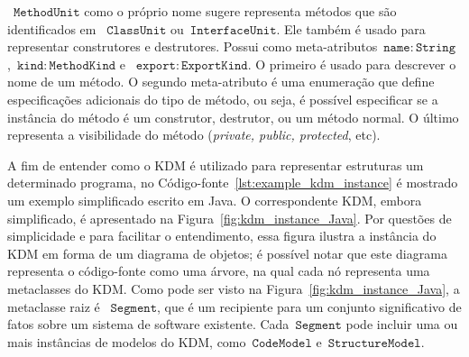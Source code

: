 ~$\mathtt{MethodUnit}$ como o próprio nome sugere representa métodos que são identificados em ~$\mathtt{ClassUnit}$ ou~$\mathtt{InterfaceUnit}$. Ele também é usado para representar construtores e destrutores. Possui como meta-atributos~$\mathtt{name:String}$,~$\mathtt{kind:MethodKind}$ e ~$\mathtt{export:ExportKind}$. O primeiro é usado para descrever o nome de um método. O segundo meta-atributo é uma enumeração que define especificações adicionais do tipo de método, ou seja, é possível especificar se a instância do método é um construtor, destrutor, ou um método normal. O último representa a visibilidade do método (\textit{private, public, protected}, etc).


A fim de entender como o KDM é utilizado para representar estruturas um determinado programa, no Código-fonte~\ref{lst:example_kdm_instance} é mostrado um exemplo simplificado escrito em Java. O correspondente KDM, embora simplificado, é apresentado na Figura~\ref{fig:kdm_instance_Java}. Por questões de simplicidade e para facilitar o entendimento, essa figura ilustra a instância do KDM em forma de um diagrama de objetos; é possível notar que este diagrama representa o código-fonte como uma árvore, na qual cada nó representa uma metaclasses do KDM. Como pode ser visto na Figura~\ref{fig:kdm_instance_Java}, a metaclasse raiz é ~$\mathtt{Segment}$, que é um recipiente para um conjunto significativo de fatos sobre um sistema de software existente. Cada~$\mathtt{Segment}$ pode incluir uma ou mais instâncias de modelos do KDM, como~$\mathtt{CodeModel}$ e~$\mathtt{StructureModel}$.


